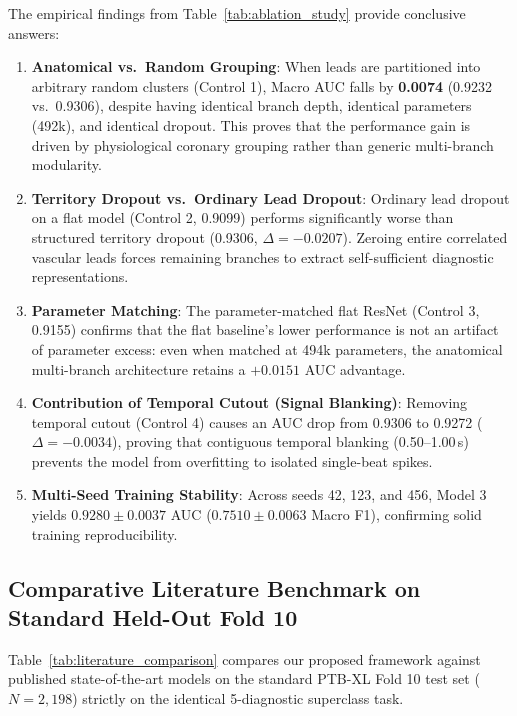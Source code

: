 \documentclass[12pt]{elsarticle}
\begin{document}
The empirical findings from Table~\ref{tab:ablation_study} provide conclusive answers:
\begin{enumerate}
    \item \textbf{Anatomical vs.\ Random Grouping}: When leads are partitioned into arbitrary random clusters (Control 1), Macro AUC falls by \textbf{0.0074} (0.9232 vs.\ 0.9306), despite having identical branch depth, identical parameters (492k), and identical dropout. This proves that the performance gain is driven by physiological coronary grouping rather than generic multi-branch modularity.
    \item \textbf{Territory Dropout vs.\ Ordinary Lead Dropout}: Ordinary lead dropout on a flat model (Control 2, 0.9099) performs significantly worse than structured territory dropout (0.9306, $\Delta = -0.0207$). Zeroing entire correlated vascular leads forces remaining branches to extract self-sufficient diagnostic representations.
    \item \textbf{Parameter Matching}: The parameter-matched flat ResNet (Control 3, 0.9155) confirms that the flat baseline's lower performance is not an artifact of parameter excess: even when matched at 494k parameters, the anatomical multi-branch architecture retains a $+0.0151$ AUC advantage.
    \item \textbf{Contribution of Temporal Cutout (Signal Blanking)}: Removing temporal cutout (Control 4) causes an AUC drop from 0.9306 to 0.9272 ($\Delta = -0.0034$), proving that contiguous temporal blanking (0.50--1.00\,s) prevents the model from overfitting to isolated single-beat spikes.
    \item \textbf{Multi-Seed Training Stability}: Across seeds 42, 123, and 456, Model 3 yields $0.9280 \pm 0.0037$ AUC ($0.7510 \pm 0.0063$ Macro F1), confirming solid training reproducibility.
\end{enumerate}

\subsection{Comparative Literature Benchmark on Standard Held-Out Fold 10}
\label{sec:literature_benchmark}
Table~\ref{tab:literature_comparison} compares our proposed framework against published state-of-the-art models on the standard PTB-XL Fold 10 test set ($N = 2,198$) strictly on the identical 5-diagnostic superclass task.
\end{document}

